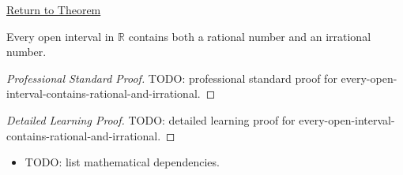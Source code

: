 \newpage
{}
\label{prf:every-open-interval-contains-rational-and-irrational}

\begin{remark*}[Return]
\hyperref[cor:every-open-interval-contains-rational-and-irrational]{Return to Theorem}
\end{remark*}

\begin{corollary*}
Every open interval in $\mathbb{R}$ contains both a rational number and an irrational number.
\end{corollary*}

\begin{proof}[Professional Standard Proof]
\LRAProofBodyStart
TODO: professional standard proof for every-open-interval-contains-rational-and-irrational.
\end{proof}

\begin{proof}[Detailed Learning Proof]
\LRAProofBodyStart
TODO: detailed learning proof for every-open-interval-contains-rational-and-irrational.
\end{proof}

\begin{remark*}
\end{remark*}

\begin{dependencies}
\begin{itemize}
  \item TODO: list mathematical dependencies.
\end{itemize}
\end{dependencies}

\clearpage
